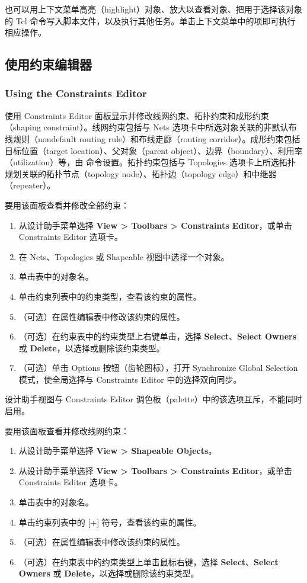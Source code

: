 也可以用上下文菜单高亮（highlight）对象、放大以查看对象、把用于选择该对象的 Tcl 命令写入脚本文件，以及执行其他任务。单击上下文菜单中的项即可执行相应操作。

\subsection{使用约束编辑器}
\subsubsection*{Using the Constraints Editor}

使用 Constraints Editor 面板显示并修改线网约束、拓扑约束和成形约束（shaping constraint）。线网约束包括与 Nets 选项卡中所选对象关联的非默认布线规则（nondefault routing rule）和布线走廊（routing corridor）。成形约束包括目标位置（target location）、父对象（parent object）、边界（boundary）、利用率（utilization）等，由  命令设置。拓扑约束包括与 Topologies 选项卡上所选拓扑规划关联的拓扑节点（topology node）、拓扑边（topology edge）和中继器（repeater）。

要用该面板查看并修改全部约束：
\begin{enumerate}
  \item 从设计助手菜单选择 \textbf{View > Toolbars > Constraints Editor}，或单击 Constraints Editor 选项卡。
  \item 在 Nets、Topologies 或 Shapeable 视图中选择一个对象。
  \item 单击表中的对象名。
  \item 单击约束列表中的约束类型，查看该约束的属性。
  \item （可选）在属性编辑表中修改该约束的属性。
  \item （可选）在约束表中的约束类型上右键单击，选择 \textbf{Select}、\textbf{Select Owners} 或 \textbf{Delete}，以选择或删除该约束类型。
  \item （可选）单击 Options 按钮（齿轮图标），打开 Synchronize Global Selection 模式，使全局选择与 Constraints Editor 中的选择双向同步。
\end{enumerate}

设计助手视图与 Constraints Editor 调色板（palette）中的该选项互斥，不能同时启用。

要用该面板查看并修改线网约束：
\begin{enumerate}
  \item 从设计助手菜单选择 \textbf{View > Shapeable Objects}。
  \item 从设计助手菜单选择 \textbf{View > Toolbars > Constraints Editor}，或单击 Constraints Editor 选项卡。
  \item 单击表中的对象名。
  \item 单击约束列表中的 [+] 符号，查看该约束的属性。
  \item （可选）在属性编辑表中修改该约束的属性。
  \item （可选）在约束表中的约束类型上单击鼠标右键，选择 \textbf{Select}、\textbf{Select Owners} 或 \textbf{Delete}，以选择或删除该约束类型。
\end{enumerate}

